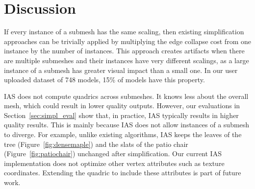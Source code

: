 \section{Discussion}
\label{sec:simplification_discussion}

If every instance of a submesh has the same scaling, then existing
simplification approaches can be trivially applied by multiplying the
edge collapse cost from one instance by the number of instances. This
approach creates artifacts when there are multiple submeshes and their
instances have very different scalings,
as a large instance of a submesh has greater visual impact
than a small one. In our user uploaded dataset of 748 models, 15\% of
models have this property.

IAS does not compute quadrics across submeshes. It knows less about
the overall mesh, which could result in lower quality outputs.
However, our evaluations in Section~\ref{sec:simpl_eval} show that, in
practice, IAS typically results in higher quality results. This is
mainly because IAS does not allow instances of a submesh to
diverge.  For example, unlike existing algorithms, IAS keeps the
leaves of the tree (Figure~\ref{fig:densemaple}) and the slats of the
patio chair (Figure~\ref{fig:patiochair}) unchanged after
simplification.  Our current IAS implementation does not optimize
other vertex attributes such as texture coordinates.
Extending the quadric to include these attributes is part of
future work.
